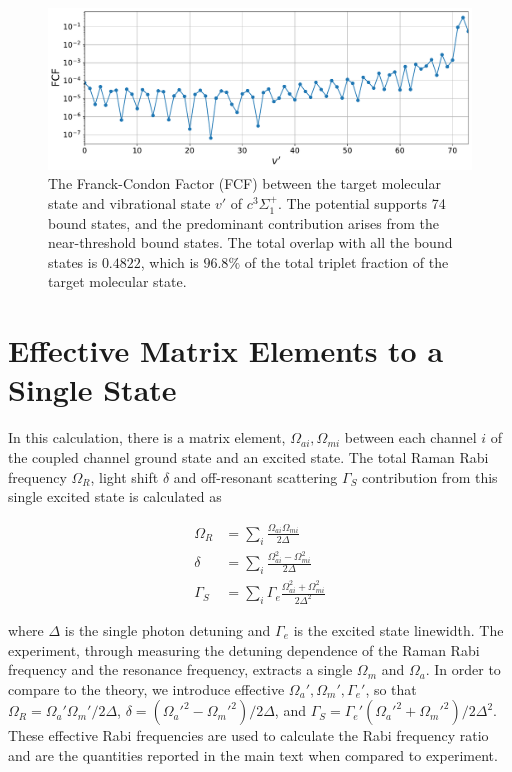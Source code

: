 \documentclass[aps,secnumarabic,amsmath,amssymb,10pt,superscriptaddress]{revtex4}
\begin{document}
\begin{figure}[ht!]
  \includegraphics[width=\textwidth]{imgs/fcf_c3sigma.pdf}
  \caption{The Franck-Condon Factor (FCF) between the target molecular state and vibrational state $v'$ of $c^3\Sigma^+_1$. The potential supports 74 bound states, and the predominant contribution arises from the near-threshold bound states. The total overlap with all the bound states is $0.4822$, which is $96.8\%$ of the total triplet fraction of the target molecular state.
    \label{f-smfcf}}
\end{figure}
\section{Effective Matrix Elements to a Single State}

In this calculation, there is a matrix element, $\Omega_{ai}, \Omega_{mi}$ between each channel $ i $ of the coupled channel ground state and an excited state. The total Raman Rabi frequency $ \Omega_R$, light shift $ \delta$ and off-resonant scattering $ \Gamma_S $ contribution from this single excited state is calculated as

\begin{align}
  \Omega_{R} &= \displaystyle\sum_{i} \frac{\Omega_{ai} \Omega_{mi}}{2\Delta} \\
  \delta &= \displaystyle\sum_{i} \frac{\Omega_{ai}^2 - \Omega_{mi}^2}{2\Delta} \\
  \Gamma_S &= \displaystyle\sum_{i} \Gamma_e \frac{\Omega_{ai}^2 + \Omega_{mi}^2}{2\Delta^2}
\end{align}

where $ \Delta $ is the single photon detuning and $ \Gamma_e $ is the excited state linewidth. The experiment, through measuring the detuning dependence of the Raman Rabi frequency and the resonance frequency, extracts a single $ \Omega_m $ and $ \Omega_a $. In order to compare to the theory, we introduce effective $ \Omega_a', \Omega_m', \Gamma_e'$, so that $ \Omega_R = \Omega_a'\Omega_m'/2\Delta $, $\delta = (\Omega_{a}'^2 - \Omega_{m}'^2)/2\Delta $, and $\Gamma_S = \Gamma_e'(\Omega_{a}'^2 + \Omega_{m}'^2)/2\Delta^2 $. These effective Rabi frequencies are used to calculate the Rabi frequency ratio and are the quantities reported in the main text when compared to experiment.
\end{document}
